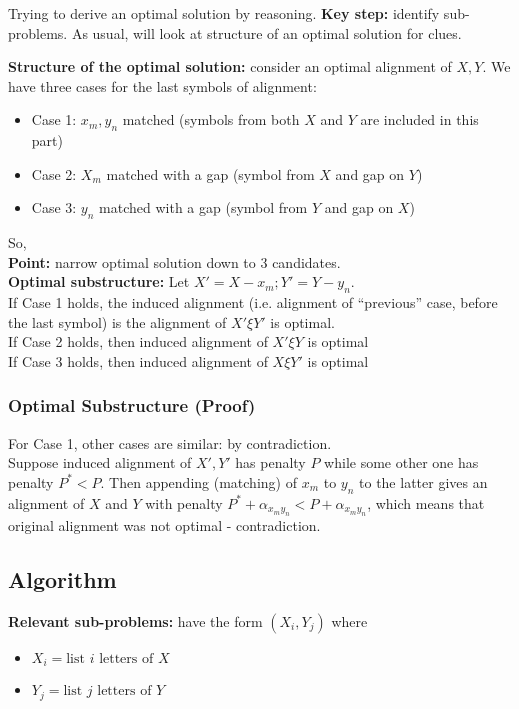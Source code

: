 \documentclass{scrartcl}
\begin{document}
Trying to derive an optimal solution by reasoning. {\bf Key step: } identify
sub-problems. As usual, will look at structure of an optimal solution for clues. 

{\bf Structure of the optimal solution: } consider an optimal alignment of $X,
Y$. We have three cases for the last symbols of alignment:
\begin{itemize}
\item Case 1: $x_m, y_n$ matched (symbols from both $X$ and $Y$ are included in this part)
\item Case 2: $X_m$ matched with a gap (symbol from $X$ and gap on $Y$)
\item Case 3: $y_n$ matched with a gap (symbol from $Y$ and gap on $X$) 
\end{itemize}
So,\\
{\bf Point: } narrow optimal solution down to 3 candidates.\\
{\bf Optimal substructure: } Let $X' = X - x_m; Y' = Y - y_n$.\\
If Case 1 holds, the induced alignment (i.e. alignment of ``previous'' case,
before the last symbol) is the alignment of $X' \xi Y'$ is optimal.\\ 
If Case 2 holds, then induced alignment of $X' \xi Y$ is optimal\\
If Case 3 holds, then induced alignment of $X \xi Y'$ is optimal\\

\subsubsection{Optimal Substructure (Proof)}
\label{sec:11-1-2}
For Case 1, other cases are similar: by contradiction.\\
Suppose induced alignment of $X', Y'$ has penalty $P$ while some other one has
penalty $P^* < P$. Then appending (matching) of $x_m$ to $y_n$ to the latter
gives an alignment of $X$ and $Y$ with penalty $P^* + \alpha_{x_m y_n} < P +
\alpha_{x_m y_n}$, which means that original alignment was not optimal -
contradiction. 

\subsection{Algorithm}
\label{sec:11-1-2}
{\bf Relevant sub-problems: } have the form $(X_i, Y_j)$ where
\begin{itemize}
\item $X_i = \text{list } i \text{ letters of } X$
\item $Y_j = \text{list } j \text{ letters of } Y$
\end{itemize}
\end{document}
